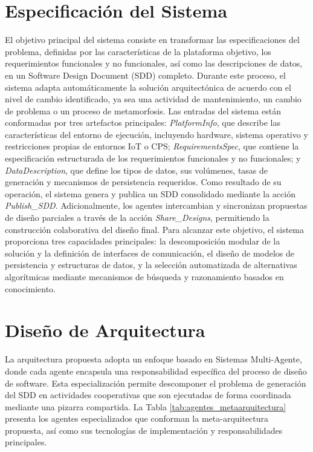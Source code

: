 \documentclass[12pt, letterpaper, oneside]{book}
\begin{document}
\section{Especificación del Sistema} El objetivo principal del sistema consiste en transformar las especificaciones del problema, definidas por las características de la plataforma objetivo, los requerimientos funcionales y no funcionales, así como las descripciones de datos, en un Software Design Document (SDD) completo. Durante este proceso, el sistema adapta automáticamente la solución arquitectónica de acuerdo con el nivel de cambio identificado, ya sea una actividad de mantenimiento, un cambio de problema o un proceso de metamorfosis. Las entradas del sistema están conformadas por tres artefactos principales: \textit{PlatformInfo}, que describe las características del entorno de ejecución, incluyendo hardware, sistema operativo y restricciones propias de entornos IoT o CPS; \textit{RequirementsSpec}, que contiene la especificación estructurada de los requerimientos funcionales y no funcionales; y \textit{DataDescription}, que define los tipos de datos, sus volúmenes, tasas de generación y mecanismos de persistencia requeridos. Como resultado de su operación, el sistema genera y publica un SDD consolidado mediante la acción \textit{Publish\_SDD}. Adicionalmente, los agentes intercambian y sincronizan propuestas de diseño parciales a través de la acción \textit{Share\_Designs}, permitiendo la construcción colaborativa del diseño final. Para alcanzar este objetivo, el sistema proporciona tres capacidades principales: la descomposición modular de la solución y la definición de interfaces de comunicación, el diseño de modelos de persistencia y estructuras de datos, y la selección automatizada de alternativas algorítmicas mediante mecanismos de búsqueda y razonamiento basados en conocimiento.


\section{Diseño de Arquitectura} La arquitectura propuesta adopta un enfoque basado en Sistemas Multi-Agente, donde cada agente encapsula una responsabilidad específica del proceso de diseño de software. Esta especialización permite descomponer el problema de generación del SDD en actividades cooperativas que son ejecutadas de forma coordinada mediante una pizarra compartida. La Tabla \ref{tab:agentes_metaarquitectura} presenta los agentes especializados que conforman la meta-arquitectura propuesta, así como sus tecnologías de implementación y responsabilidades principales.
\end{document}
